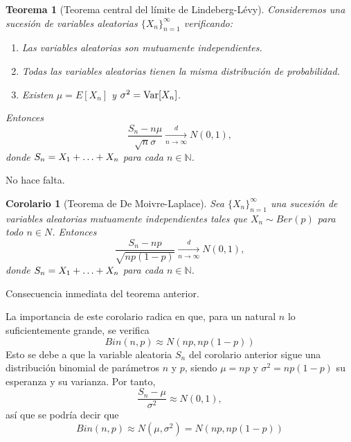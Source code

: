 \documentclass[11pt]{report}
\makeatletter
\renewenvironment{proof}[1][\proofname]{\par
  \pushQED{\qed}%
  \normalfont \topsep\z@skip %
  \trivlist
  \item[\hskip\labelsep
        \itshape
    #1\@addpunct{.}]\ignorespaces
}{%
  \popQED\endtrivlist\@endpefalse
}
\theoremstyle{mytheorem}
\newtheorem{corollary}{Corolario} %
\newtheorem{theorem}{Teorema}
\theoremstyle{mydefinition}
\theoremstyle{myexample}
\let\oldproofname=\proofname
\renewcommand{\proofname}{\rm\bf{\oldproofname}}}
\newenvironment{ctheorem} %
  {\begin{mdframed}[
        linewidth=3pt,
        linecolor=c2,
        bottomline=false,
        topline=false,
        rightline=false,
        innerrightmargin=0pt,
        innertopmargin=0pt,
        innerbottommargin=0pt,
        innerleftmargin=1em,
        skipabove=\baselineskip]
    \begin{theorem}}
  {\end{theorem}\end{mdframed}}
\newenvironment{ccorollary} %
  {\begin{mdframed}[
        linewidth=3pt,
        linecolor=c2,
        bottomline=false,
        topline=false,
        rightline=false,
        innerrightmargin=0pt,
        innertopmargin=0pt,
        innerbottommargin=0pt,
        innerleftmargin=1em,
        skipabove=\baselineskip]
    \begin{corollary}}
  {\end{corollary}\end{mdframed}}
\newcommand{\N}{\mathbb N}
\makeatother
\begin{document}
\begin{ctheorem}[{Teorema central del límite de Lindeberg-Lévy}]
Consideremos una sucesión de variables aleatorias $\{X_n\}_{n=1}^\infty$ verificando:
\begin{enumerate}
    \item Las variables aleatorias son mutuamente independientes.
    \item Todas las variables aleatorias tienen la misma distribución de probabilidad.
    \item Existen $\mu=E[X_n]$ y $\sigma^2=\textup{Var}[X_n]$.
\end{enumerate}
Entonces
\[\frac{S_n-n\mu}{\sqrt{n}\sigma} \xrightarrow[n\to\infty]{d}N(0,1),\]
donde $S_n=X_1+\mathellipsis+X_n$ para cada $n \in \N$.
\end{ctheorem}

\begin{proof}
No hace falta.
\end{proof}

\begin{ccorollary}[{Teorema de De Moivre-Laplace}]
Sea $\{X_n\}_{n=1}^\infty$ una sucesión de variables aleatorias mutuamente independientes tales que $X_n \sim Ber(p)$ para todo $n \in N$. Entonces
\[\frac{S_n-np}{\sqrt{np(1-p)}} \xrightarrow[n\to\infty]{d}N(0,1),\]
donde $S_n=X_1+\mathellipsis+X_n$ para cada $n \in \N$.
\end{ccorollary}

\begin{proof}
Consecuencia inmediata del teorema anterior.
\end{proof}

La importancia de este corolario radica en que, para un natural $n$ lo suficientemente grande, se verifica
\[Bin(n,p) \approx N(np,np(1-p))\]
Esto se debe a que la variable aleatoria $S_n$ del corolario anterior sigue una distribución binomial de parámetros $n$ y $p$, siendo $\mu =np$ y $\sigma^2 =np(1-p)$ su esperanza y su varianza. Por tanto,
\[\frac{S_n-\mu}{\sigma^2} \approx N(0,1),\]
así que se podría decir que
\[Bin(n,p) \approx N(\mu,\sigma^2) = N(np,np(1-p))\]
\end{document}
